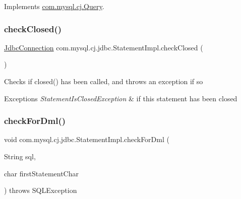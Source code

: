Implements \mbox{\hyperlink{interfacecom_1_1mysql_1_1cj_1_1_query_add91f39e25b2687d5ae8637d59e470f5}{com.\+mysql.\+cj.\+Query}}.

\mbox{\label{classcom_1_1mysql_1_1cj_1_1jdbc_1_1_statement_impl_abd738a18f0109b2305a642025eb4a3bb}} 
\subsubsection{\texorpdfstring{check\+Closed()}{checkClosed()}}
{\footnotesize\ttfamily \mbox{\hyperlink{interfacecom_1_1mysql_1_1cj_1_1jdbc_1_1_jdbc_connection}{Jdbc\+Connection}} com.\+mysql.\+cj.\+jdbc.\+Statement\+Impl.\+check\+Closed (\begin{DoxyParamCaption}{ }\end{DoxyParamCaption})\hspace{0.3cm}{\ttfamily [protected]}}

Checks if closed() has been called, and throws an exception if so


\begin{DoxyExceptions}{Exceptions}
{\em Statement\+Is\+Closed\+Exception} & if this statement has been closed \\
\hline
\end{DoxyExceptions}
\mbox{\label{classcom_1_1mysql_1_1cj_1_1jdbc_1_1_statement_impl_a153a70521a7a239c1d6ad089f474d7ba}} 
\subsubsection{\texorpdfstring{check\+For\+Dml()}{checkForDml()}}
{\footnotesize\ttfamily void com.\+mysql.\+cj.\+jdbc.\+Statement\+Impl.\+check\+For\+Dml (\begin{DoxyParamCaption}\item[{String}]{sql,  }\item[{char}]{first\+Statement\+Char }\end{DoxyParamCaption}) throws S\+Q\+L\+Exception\hspace{0.3cm}{\ttfamily [protected]}}

